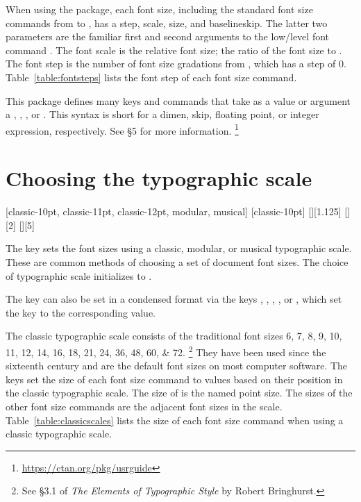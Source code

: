 \documentclass{beery}
\begin{document}
When using the  package, each font size, including the standard font size commands from  to , has a step, scale, size, and baselineskip.
The latter two parameters are the familiar first and second arguments to the low\-/level font command .
The font scale is the relative font size; the ratio of the font size to .
The font step is the number of font size gradations from , which has a step of \num{0}.
Table~\ref{table:fontsteps} lists the font step of each font size command.



This package defines many keys and commands that take as a value or argument a , , , or .
This syntax is short for a dimen, skip, floating point, or integer expression, respectively.
See  \S5 for more information.%
\footnote{\url{https://ctan.org/pkg/usrguide}}


\section{Choosing the typographic scale}
\label{sec:choosing}

  [classic-10pt, classic-11pt, classic-12pt, modular, musical]
  [classic-10pt]
\newline
{}[][1.125]
\newline
{}[][2]%
\nopagebreak\newline
{}[][5]

The key  sets the font sizes using a classic, modular, or musical typographic scale.
These are common methods of choosing a set of document font sizes.
The choice of typographic scale initializes to .

The key  can also be set in a condensed format via the keys , , , , or , which set the key  to the corresponding value.

The classic typographic scale consists of the traditional font sizes
\numlist{6;7;8;9;10;11;12;14;16;18;21;24;36;48;60;72}.%
\footnote{See \S{}3.1 of \textit{The Elements of Typographic Style} by Robert Bringhurst.}
They have been used since the sixteenth century and are the default font sizes on most computer software.
The keys  set the size of each font size command to values based on their position in the classic typographic scale.
The size of  is the named point size.
The sizes of the other font size commands are the adjacent font sizes in the scale.
Table~\ref{table:classicscales} lists the size of each font size command when using a classic typographic scale.
\end{document}
